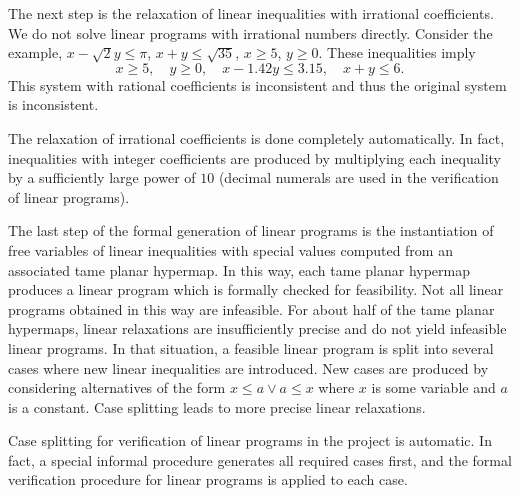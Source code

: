 The next step is the relaxation of linear inequalities with irrational
coefficients. We do not solve linear programs with irrational numbers
directly.  Consider the example, $x - \sqrt{2} y \le \pi$, $x + y \le
\sqrt{35}$, $x \ge 5$, $y \ge 0$. These inequalities imply
\begin{equation*}\label{eqn:35}
x\ge 5, \quad
y \ge 0, \quad
x - 1.42 y \le 3.15,\quad
x + y \le 6.
\end{equation*}
This system with rational coefficients is inconsistent and thus
the original system is inconsistent.

The relaxation of irrational coefficients is done completely
automatically. In fact, inequalities with integer coefficients are
produced by multiplying each inequality by a sufficiently large power
of $10$ (decimal numerals are used in the verification of linear
programs).

The last step of the formal generation of linear programs is the
instantiation of free variables of linear inequalities with special
values computed from an associated tame planar hypermap. In this way,
each tame planar hypermap produces a linear program which is formally
checked for feasibility. Not all linear programs obtained in this way
are infeasible.  For about half of the tame planar hypermaps, linear
relaxations are insufficiently precise and do not yield infeasible
linear programs.  In that situation, a feasible linear program is
split into several cases where new linear inequalities are
introduced. New cases are produced by considering alternatives of the
form $x \le a \vee a \le x$ where $x$ is some variable and $a$ is a
constant.  Case splitting leads to more precise linear relaxations.

Case splitting for verification of linear programs in the project is
automatic. In fact, a special informal procedure generates all required
cases first, and the formal verification procedure for linear programs is
applied to each case.

